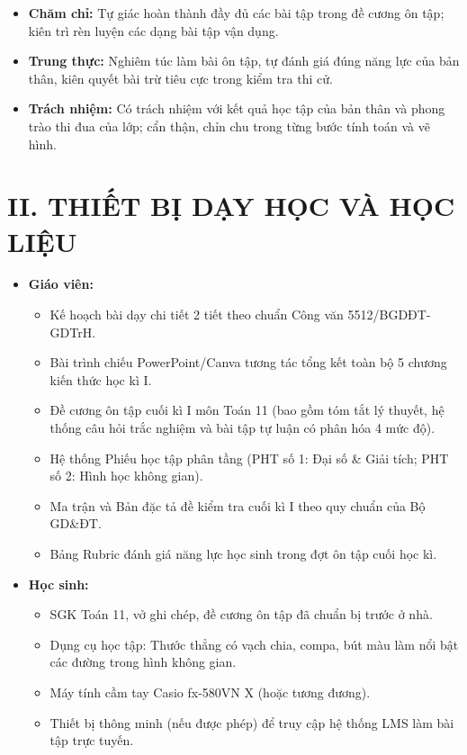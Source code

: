 \documentclass[12pt, a4paper]{article}
\begin{document}
\begin{itemize}[leftmargin=1.2cm]
    \item \textbf{Chăm chỉ:} Tự giác hoàn thành đầy đủ các bài tập trong đề cương ôn tập; kiên trì rèn luyện các dạng bài tập vận dụng.
    \item \textbf{Trung thực:} Nghiêm túc làm bài ôn tập, tự đánh giá đúng năng lực của bản thân, kiên quyết bài trừ tiêu cực trong kiểm tra thi cử.
    \item \textbf{Trách nhiệm:} Có trách nhiệm với kết quả học tập của bản thân và phong trào thi đua của lớp; cẩn thận, chỉn chu trong từng bước tính toán và vẽ hình.
\end{itemize}

\vspace{5pt}

\section*{II. THIẾT BỊ DẠY HỌC VÀ HỌC LIỆU}

\begin{itemize}[leftmargin=1.2cm]
    \item \textbf{Giáo viên:}
    \begin{itemize}[leftmargin=0.6cm]
        \item Kế hoạch bài dạy chi tiết 2 tiết theo chuẩn Công văn 5512/BGDĐT-GDTrH.
        \item Bài trình chiếu PowerPoint/Canva tương tác tổng kết toàn bộ 5 chương kiến thức học kì I.
        \item Đề cương ôn tập cuối kì I môn Toán 11 (bao gồm tóm tắt lý thuyết, hệ thống câu hỏi trắc nghiệm và bài tập tự luận có phân hóa 4 mức độ).
        \item Hệ thống Phiếu học tập phân tầng (PHT số 1: Đại số \& Giải tích; PHT số 2: Hình học không gian).
        \item Ma trận và Bản đặc tả đề kiểm tra cuối kì I theo quy chuẩn của Bộ GD\&ĐT.
        \item Bảng Rubric đánh giá năng lực học sinh trong đợt ôn tập cuối học kì.
    \end{itemize}

    \item \textbf{Học sinh:}
    \begin{itemize}[leftmargin=0.6cm]
        \item SGK Toán 11, vở ghi chép, đề cương ôn tập đã chuẩn bị trước ở nhà.
        \item Dụng cụ học tập: Thước thẳng có vạch chia, compa, bút màu làm nổi bật các đường trong hình không gian.
        \item Máy tính cầm tay Casio fx-580VN X (hoặc tương đương).
        \item Thiết bị thông minh (nếu được phép) để truy cập hệ thống LMS làm bài tập trực tuyến.
    \end{itemize}
\end{itemize}
\end{document}
